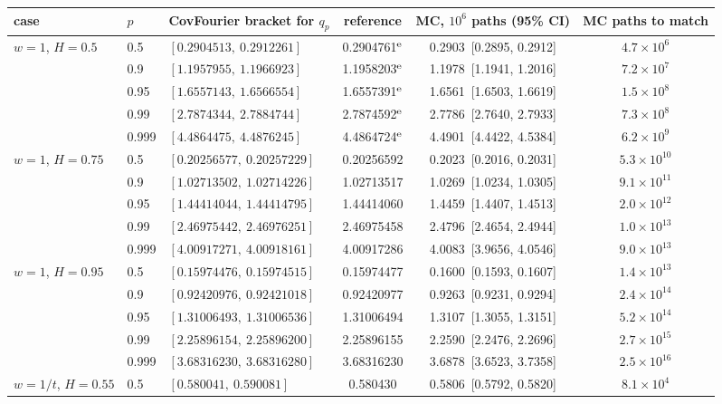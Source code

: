 \begin{tabular}{lllccc}\toprule
case & $p$ & CovFourier bracket for $q_p$ & reference & MC, $10^6$ paths (95\% CI) & MC paths to match\\\midrule
$w=1$, $H=0.5$ & 0.5 & $[0.2904513,\ 0.2912261]$ & 0.2904761$^{\rm e}$ & 0.2903\ [0.2895, 0.2912] & $4.7\times10^{6}$\\
 & 0.9 & $[1.1957955,\ 1.1966923]$ & 1.1958203$^{\rm e}$ & 1.1978\ [1.1941, 1.2016] & $7.2\times10^{7}$\\
 & 0.95 & $[1.6557143,\ 1.6566554]$ & 1.6557391$^{\rm e}$ & 1.6561\ [1.6503, 1.6619] & $1.5\times10^{8}$\\
 & 0.99 & $[2.7874344,\ 2.7884744]$ & 2.7874592$^{\rm e}$ & 2.7786\ [2.7640, 2.7933] & $7.3\times10^{8}$\\
 & 0.999 & $[4.4864475,\ 4.4876245]$ & 4.4864724$^{\rm e}$ & 4.4901\ [4.4422, 4.5384] & $6.2\times10^{9}$\\
\addlinespace
$w=1$, $H=0.75$ & 0.5 & $[0.20256577,\ 0.20257229]$ & 0.20256592 & 0.2023\ [0.2016, 0.2031] & $5.3\times10^{10}$\\
 & 0.9 & $[1.02713502,\ 1.02714226]$ & 1.02713517 & 1.0269\ [1.0234, 1.0305] & $9.1\times10^{11}$\\
 & 0.95 & $[1.44414044,\ 1.44414795]$ & 1.44414060 & 1.4459\ [1.4407, 1.4513] & $2.0\times10^{12}$\\
 & 0.99 & $[2.46975442,\ 2.46976251]$ & 2.46975458 & 2.4796\ [2.4654, 2.4944] & $1.0\times10^{13}$\\
 & 0.999 & $[4.00917271,\ 4.00918161]$ & 4.00917286 & 4.0083\ [3.9656, 4.0546] & $9.0\times10^{13}$\\
\addlinespace
$w=1$, $H=0.95$ & 0.5 & $[0.15974476,\ 0.15974515]$ & 0.15974477 & 0.1600\ [0.1593, 0.1607] & $1.4\times10^{13}$\\
 & 0.9 & $[0.92420976,\ 0.92421018]$ & 0.92420977 & 0.9263\ [0.9231, 0.9294] & $2.4\times10^{14}$\\
 & 0.95 & $[1.31006493,\ 1.31006536]$ & 1.31006494 & 1.3107\ [1.3055, 1.3151] & $5.2\times10^{14}$\\
 & 0.99 & $[2.25896154,\ 2.25896200]$ & 2.25896155 & 2.2590\ [2.2476, 2.2696] & $2.7\times10^{15}$\\
 & 0.999 & $[3.68316230,\ 3.68316280]$ & 3.68316230 & 3.6878\ [3.6523, 3.7358] & $2.5\times10^{16}$\\
\addlinespace
$w=1/t$, $H=0.55$ & 0.5 & $[0.580041,\ 0.590081]$ & 0.580430 & 0.5806\ [0.5792, 0.5820] & $8.1\times10^{4}$\\

\end{tabular}

